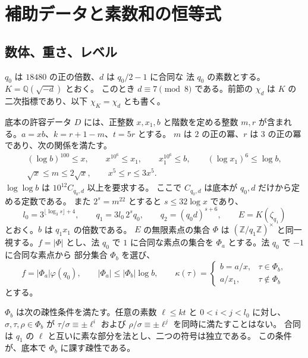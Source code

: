\section{補助データと素数和の恒等式}\label{sec:data}

\subsection{数体、重さ、レベル}

\(q_0\) は \(18480\) の正の倍数、\(d\) は \(q_0/2-1\) に合同な
法 \(q_0\) の素数とする。\(K=\mathbb Q(\sqrt{-d})\) とおく。
このとき \(d\equiv7\pmod8\) である。前節の \(\chi_d\) は \(K\) の二次指標であり、以下 \(\chi_K=\chi_d\) とも書く。

底本の許容データ \(D\) には、正整数 \(x,x_1,b\) と階数を定める整数 \(m,r\)
が含まれる。\(a=xb\)、\(k=r+1-m\)、\(t=5r\) とする。
\(m\) は \(2\) の正の冪、\(r\) は \(3\) の正の冪であり、次の関係を満たす。
\begin{gather*}
 (\log b)^{100}\le x,\qquad
 x^{10^6}\le x_1,\qquad x_1^{10^6}\le b,\qquad
 (\log x_1)^6\le\log b,\\
 \sqrt{x}\le m\le 2\sqrt{x},\qquad x^5\le r\le 3x^5.
\end{gather*}
\(\log\log b\) は \(10^{12}C_{q_0,d}\) 以上を要求する。
ここで \(C_{q_0,d}\) は底本が \(q_0,d\) だけから定める定数である。
また \(2^s=m^{22}\) とすると \(s\le32\log x\) であり、
\[
  l_0=3^{\lfloor\log_3 s\rfloor+4},\qquad
  q_1=3l_0\,2^s q_0,\qquad q_2=(q_0d)^{s+6},\qquad
  E=K(\zeta_{q_1})
\]
とおく。\(b\) は \(q_1x_1\) の倍数である。
\(E\) の無限素点の集合 \(\Phi\) は \((\mathbb Z/q_1\mathbb Z)^\times\)
と同一視する。\(f=|\Phi|\) とし、法 \(q_0\) で \(1\) に合同な素点の集合を
\(\Phi_a\) とする。法 \(q_0\) で \(-1\) に合同な素点から
部分集合 \(\Phi_b\) を選び、
\[
  f=|\Phi_a|\varphi(q_0),\qquad
  |\Phi_a|\le|\Phi_b|\log b,\qquad
  \kappa(\tau)=
  \begin{cases}
    b=a/x,&\tau\in\Phi_b,\\
    a/x_1,&\tau\notin\Phi_b
  \end{cases}
\]
とする。

\(\Phi_b\) は次の疎性条件を満たす。任意の素数 \(\ell\le kt\) と
\(0<i<j<l_0\) に対し、\(\sigma,\tau,\rho\in\Phi_b\) が
\(\tau/\sigma\equiv\pm\ell^i\) および
\(\rho/\sigma\equiv\pm\ell^j\) を同時に満たすことはない。
合同は \(q_1\) の \(\ell\) と互いに素な部分を法とし、二つの符号は独立である。
この条件が、底本で \(\Phi_b\) に課す疎性である。

